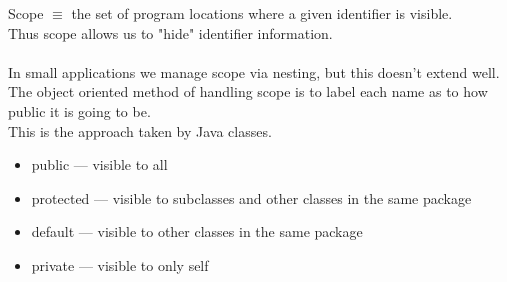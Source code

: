 \documentclass[../../lecture_notes.tex]{subfiles}
\begin{document}
Scope $\equiv$ the set of program locations where a given identifier is visible.\\
Thus scope allows us to "hide" identifier information.\\
\\
In small applications we manage scope via nesting, but this doesn’t extend well.\\
The object oriented method of handling scope is to label each name as to how public it is going to be.\\
	This is the approach taken by Java classes.
	\begin{itemize} [itemsep=0mm]
		\item public — visible to all
		\item protected — visible to subclasses and other classes in the same package
		\item default — visible to other classes in the same package
		\item private — visible to only self
	\end{itemize}
\end{document}
